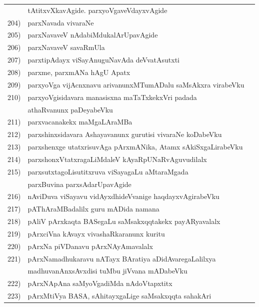 \begin{longtable}{@{}cp{7.4cm}r}
     & tAtitxvXkavAgide. parxyoVgaveVdayxvAgide & \pageref{page185}\\
204) & parxNavada vivaraNe & \pageref{page121a}\\
205) & parxNavaveV nAdabiMdukalArUpavAgide & \pageref{page161a}\\
206) & parxNavaveV savaRmUla & \pageref{page100a}\\
207) & parxtipAdayx viSayAnuguNavAda deVvatAsutxti & \pageref{page128}\\
208) & parxme, parxmANa hAgU Apatx & \pageref{page135a}\\
209) & parxyoVga vijAcnxnavu arivanunxMTumADalu saMsAkxra virabeVku & \pageref{page162}\\
210) & parxyoVgisidavara manasisxna maTaTxkekxVri padada & \\
     & athaRvanunx paDeyabeVku & \pageref{page216a}\\
211) & parxvacanakekx maMgaLAraMBa & \pageref{page102}\\ 
212) & parxshinxsidavara Ashayavanunx gurutisi vivaraNe koDabeVku & \pageref{page218a}\\
213) & parxshenxge utatxrisuvAga pArxmANika, Atamx sAkiSxgaLirabeVku & \pageref{page141a}\\
214) & parxshonxVtatxragaLiMdaleV kAyaRpUNaRvAguvudilalx & \pageref{page213b}\\
215) & parxsutxtagoLisutitxruva viSayagaLu aMtaraMgada  & \\
     & parxBuvina parxsAdarUpavAgide & \pageref{page130}\\
216) & nAviDuva viSayavu vidAyxdhideVvanige haqdayxvAgirabeVku & \pageref{page64a}\\
217) & pAThAraMBadalilx guru mADida namana & \pageref{page64}\\
218) & pAliV pArxkaqta BASegaLu saMsakxqqtakekx payARyavalalx & \pageref{page44b}\\
219) & pArxciVna kAvayx vivashaRkaranunx kuritu & \pageref{page247}\\
220) & pArxNa piVDanavu pArxNAyAmavalalx &\pageref{page202}\\  
221) & pArxNamadhukaravu nATayx BAratiya aDidAvaregaLalilxya & \\
     & madhuvanAnxsAvxdisi tuMbu jiVvana mADabeVku & \pageref{page81a}\\
222) & pArxNApAna saMyoVgadiMda nAdoVtapxtitx & \pageref{page170}\\
223) & pArxMtiVya BASA, sAhitayxgaLige saMsakxqqta sahakAri & \pageref{page36a}\\

\end{longtable}
